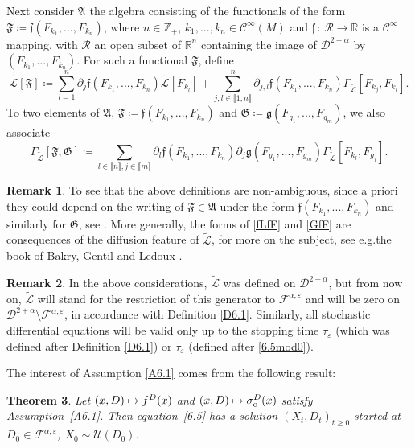 \documentclass[10pt]{amsart}
\newcommand\mto{\mathchoice{\longmapsto}{\mapsto}{\mapsto}{\mapsto}}
\theoremstyle{plain}
\newtheorem{thm}{Theorem}[section]
\theoremstyle{definition}
\newtheorem{remark}[thm]{Remark}
\newcommand{\RR}{{\mathbb R}}
\newcommand{\ZZ}{\mathbb{Z}}
\newcommand{\SF}{{\mathscr F}}
\newcommand{\SL}{{\mathscr L}}
\newcommand{\SU}{{\mathscr U}}
\newcommand\df{\coloneqq}
\newcommand{\lin}{\llbracket}
\newcommand{\rin}{\rrbracket}
\newcommand{\bqn}[1]{\begin{equation}\label{#1}}
\newcommand{\eqn}{\end{equation}}
\newcommand{\st}{\,:\,}
\let\di\displaystyle
\let\a\alpha
\let\e\varepsilon
\let\pa\partial
\let\wi\widetilde
\let\iy\infty
\newcommand{\cC}{\mathcal{C}}
\newcommand{\cD}{\mathcal{D}}
\newcommand{\cF}{\mathcal{F}}
\newcommand{\cR}{\mathcal{R}}
\newcommand{\fA}{\mathfrak{A}}
\newcommand{\fG}{\mathfrak{G}}
\newcommand{\fF}{\mathfrak{F}}
\newcommand{\ff}{\mathfrak{f}}
\newcommand{\frg}{\mathfrak{g}}
\providecommand{\eg}{e.g.}\providecommand{\ie}{i.e.}\providecommand{\resp}{resp.}\let\Subsection\subsection
\begin{document}
Next consider $\fA$ the algebra consisting of the
functionals of the form
$\fF\df\ff(F_{k_1},..., F_{k_n})$, where $n\in\ZZ_+$, $k_1,..., k_n\in \cC^\iy(M)$ and $\ff\st \cR\to \RR$ is a $\cC^\iy$ mapping, with $\cR$ an open subset of $\RR^n$ containing the image of $\cD^{2+\alpha}$ by $(F_{k_1},..., F_{k_n})$.
For such a functional $\fF$, define
\begin{equation}
\label{fLfF}
\wi\SL[\fF]
\df
\sum_{l=1}^n \pa_j\ff(F_{k_1},..., F_{k_n}) \wi\SL[F_{k_l}]
+\sum_{j,l\in\lin 1,n\rin}^n \pa_{j,l}\ff(F_{k_1},..., F_{k_n})\Gamma_{\wi\SL} [F_{k_j},F_{k_l}].
\end{equation}
To two elements of $\fA$, $\fF\df\ff(F_{k_1},..., F_{k_n})$ and $\fG\df\frg(F_{g_1},..., F_{g_m})$, we also associate
\bqn{GfF}
\Gamma_{\wi\SL} [\fF,\fG]\df \!\!\!\!\sum_{l\in\lin n\rin, j\in\lin m\rin} \pa_l\ff(F_{k_1},..., F_{k_n})\pa_j\frg(F_{g_1},..., F_{g_m})\Gamma_{\wi\SL} [F_{k_l},F_{g_j}].
\eqn
\par
\begin{remark}
To see that the above definitions are non-ambiguous, since a priori they could depend on the writing of $\fF\in\fA$ under the form
$\ff(F_{k_1},..., F_{k_n})$ and similarly for $\fG$, see \cite[Rem.\,2]{zbMATH07470497}. More generally, the forms of \eqref{fLfF} and \eqref{GfF}
are consequences of the diffusion feature of $\wi\SL$, for more on the subject, see \eg the book of Bakry, Gentil and Ledoux \cite{MR3155209}.
\end{remark}
\par
\begin{remark}\label{rm-stop}
In the above considerations, $\wi\SL$ was defined on $\cD^{2+\a}$, but from now on, $\wi\SL$ will stand for the restriction of this generator
to $\cF^{\a,\e}$ and will be zero on $\cD^{2+\a}\setminus\cF^{\a,\e}$, in accordance with Definition \ref{D6.1}. Similarly, all stochastic differential equations
will be valid only up to the stopping time $\tau_\e$ (which was defined after Definition \ref{D6.1}) or $\wi\tau_\e$ (defined after \eqref{6.5mod0}).
\end{remark}
\par
The interest of Assumption \ref{A6.1} comes from the following result:
\begin{thm}
\label{C6.1}
Let $(x,D)\mto f^D(x)$ and $(x,D)\mto \sigma_{\mathrm c}^D(x)$ satisfy Assumption~\ref{A6.1}. Then
equation~\eqref{6.5} has a solution $\di \left(X_{t}, D_t\right)_{t\geq 0}$ started at $D_0\in \SF^{\a, \e}$, $X_0\sim \SU(D_0)$.
\end{thm}
\end{document}
